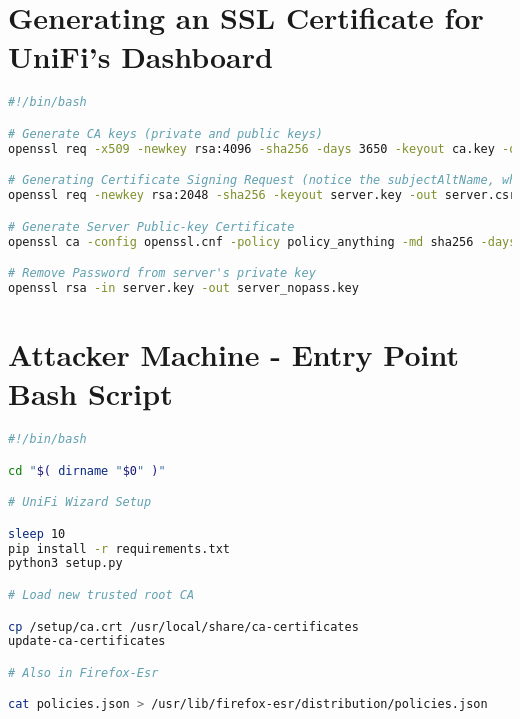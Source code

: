 \chapter{Generating an SSL Certificate for UniFi's Dashboard} \label{ap1:ansible_generate_ssl_certificate_unifi}

\begin{lstlisting}[language=bash,caption=Generating an SSL Certificate for UniFi's dashboard.]
#!/bin/bash

# Generate CA keys (private and public keys)
openssl req -x509 -newkey rsa:4096 -sha256 -days 3650 -keyout ca.key -out ca.crt

# Generating Certificate Signing Request (notice the subjectAltName, which is mandatory, at least in Firefox!)
openssl req -newkey rsa:2048 -sha256 -keyout server.key -out server.csr -subj "/CN=example-domain.ui.com/O=UniFi/C=US" -passout pass:pass -addext "subjectAltName = DNS:example-domain.ui.com"

# Generate Server Public-key Certificate
openssl ca -config openssl.cnf -policy policy_anything -md sha256 -days 3650 -in server.csr -out server.crt -batch -cert ca.crt -keyfile ca.key

# Remove Password from server's private key
openssl rsa -in server.key -out server_nopass.key
\end{lstlisting}

\blankpage

\chapter{Attacker Machine - Entry Point Bash Script} \label{ap1:log4j_entrypoint_script}

\begin{lstlisting}[language=bash,caption=Attacker Machine - Entrypoint Bash Script.]
#!/bin/bash

cd "$( dirname "$0" )"

# UniFi Wizard Setup 

sleep 10
pip install -r requirements.txt
python3 setup.py

# Load new trusted root CA

cp /setup/ca.crt /usr/local/share/ca-certificates
update-ca-certificates

# Also in Firefox-Esr

cat policies.json > /usr/lib/firefox-esr/distribution/policies.json
\end{lstlisting}

\blankpage

